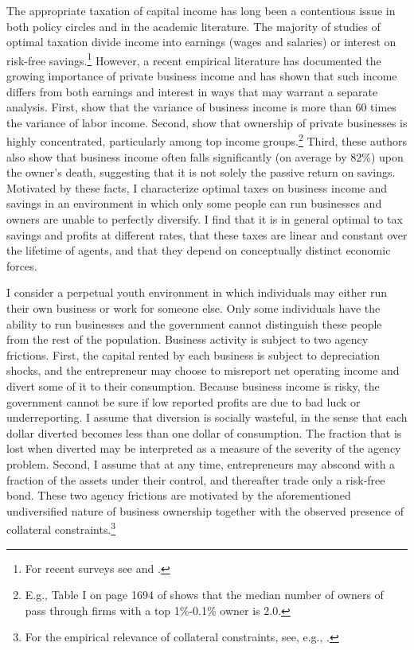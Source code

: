 \documentclass[11pt]{article}
\theoremstyle{plain}
\theoremstyle{definition} %
\begin{document}
The appropriate taxation of capital income has long been a contentious issue in both policy circles and in the academic literature. The majority of studies of optimal taxation divide income into earnings (wages and salaries) or interest on risk-free savings.\footnote{For recent surveys see \cite{bastani_how_2020} and \cite{stantcheva_dynamic_2020}.} However, a recent empirical literature has documented the growing importance of private business income and has shown that such income differs from both earnings and interest in ways that may warrant a separate analysis. First, \cite{debacker_risky_2022} show that the variance of business income is more than 60 times the variance of labor income. Second, \cite{smith_capitalists_2019} show that ownership of private businesses is highly concentrated, particularly among top income groups.\footnote{E.g., Table I on page 1694 of \cite{smith_capitalists_2019} shows that the median number of owners of pass through firms with a top 1\%-0.1\% owner is 2.0.} Third, these authors also show that business income often falls significantly (on average by 82\%) upon the owner's death, suggesting that it is not solely the passive return on savings. Motivated by these facts, I characterize optimal taxes on business income and savings in an environment in which only some people can run businesses and owners are unable to perfectly diversify. I find that it is in general optimal to tax savings and profits at different rates, that these taxes are linear and constant over the lifetime of agents, and that they depend on conceptually distinct economic forces. 

I consider a perpetual youth environment in which individuals may either run their own business or work for someone else. Only some individuals have the ability to run businesses and the government cannot distinguish these people from the rest of the population. Business activity is subject to two agency frictions. First, the capital rented by each business is subject to depreciation shocks, and the entrepreneur may choose to misreport net operating income and divert some of it to their consumption. Because business income is risky, the government cannot be sure if low reported profits are due to bad luck or underreporting. I assume that diversion is socially wasteful, in the sense that each dollar diverted becomes less than one dollar of consumption. The fraction that is lost when diverted may be interpreted as a measure of the severity of the agency problem. Second, I assume that at any time, entrepreneurs may abscond with a fraction of the assets under their control, and thereafter trade only a risk-free bond. These two agency frictions are motivated by the aforementioned undiversified nature of business ownership together with the observed presence of collateral constraints.\footnote{For the empirical relevance of collateral constraints, see, e.g., \cite{cagetti_entrepreneurship_2006}.}
\end{document}
